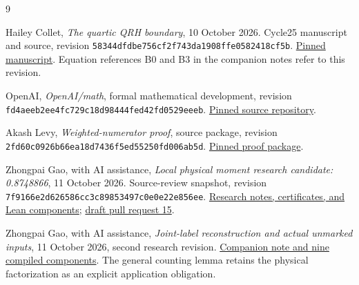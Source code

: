 \documentclass[11pt]{article}
\theoremstyle{definition}
\newcommand{\code}[1]{\texttt{\small #1}}
\begin{document}
\begin{thebibliography}{9}
\raggedright
{}
Hailey Collet, \emph{The quartic QRH boundary}, 10 October 2026.
Cycle25 manuscript and source, revision
\code{58344dfdbe756cf2f743da1908ffe0582418cf5b}.
\href{https://github.com/HaileyStorm/QuasiRiemannTracker/blob/58344dfdbe756cf2f743da1908ffe0582418cf5b/public/proofs/cycle25-quartic-20261010/paper.tex}{Pinned manuscript}.
Equation references B0 and B3 in the companion notes refer to this revision.

OpenAI, \emph{OpenAI/math}, formal mathematical development,
revision \code{fd4aeeb2ee4fc729c18d98444fed42fd0529eeeb}.
\href{https://github.com/openai/math/tree/fd4aeeb2ee4fc729c18d98444fed42fd0529eeeb}{Pinned source repository}.

Akash Levy, \emph{Weighted-numerator proof}, source package,
revision \code{2fd60c0926b66ea18d7436f5ed55250fd006ab5d}.
\href{https://github.com/akashlevy/QuasiRiemannTracker/tree/2fd60c0926b66ea18d7436f5ed55250fd006ab5d/proofs/akashlevy-20261009-weighted-numerator}{Pinned proof package}.

Zhongpai Gao, with AI assistance,
\emph{Local physical moment research candidate: 0.8748866},
11 October 2026. Source-review snapshot,
revision \code{7f9166e2d626586cc3c89853497c0e0e22e856ee}.
\href{https://github.com/Gaozhongpai/QuasiRiemannTracker/tree/7f9166e2d626586cc3c89853497c0e0e22e856ee/proofs/gao-local-moment-20261011}{Research notes, certificates, and Lean components};
\href{https://github.com/GTimG/QuasiRiemannTracker/pull/15}{draft pull request 15}.

Zhongpai Gao, with AI assistance,
\emph{Joint-label reconstruction and actual unmarked inputs},
11 October 2026, second research revision.
\href{https://github.com/Gaozhongpai/QuasiRiemannTracker/tree/gao-local-moment-source-review-20261011/proofs/gao-local-moment-20261011-v2}{Companion note and nine compiled components}.
The general counting lemma retains the physical factorization as an
explicit application obligation.
\end{thebibliography}
\end{document}
